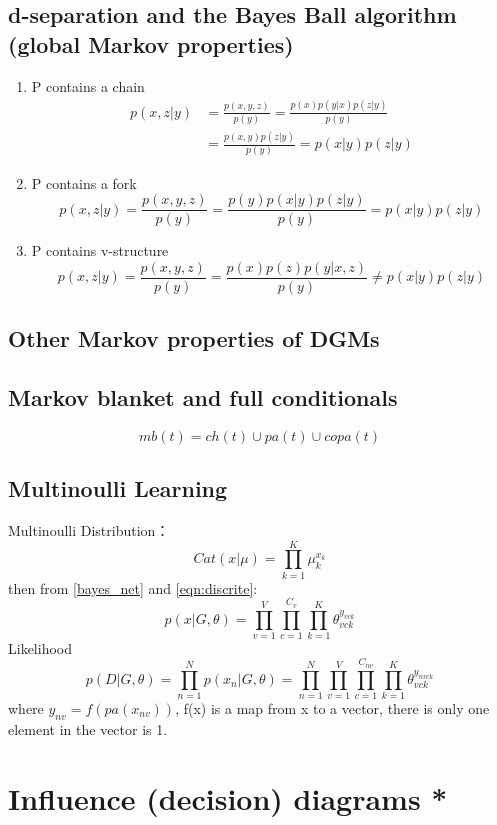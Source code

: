 \subsection{d-separation and the Bayes Ball algorithm (global Markov properties)}
\begin{enumerate}
\item P contains a chain
\begin{equation}\begin{split}
p(x,z|y) & = \frac{p(x,y,z)}{p(y)}
= \frac{p(x)p(y|x)p(z|y)}{p(y)} \\
 & = \frac{p(x,y)p(z|y)}{p(y)} = p(x|y)p(z|y)
\end{split}\end{equation}

\item P contains a fork
\begin{equation}
p(x,z|y) = \frac{p(x,y,z)}{p(y)}
= \frac{p(y)p(x|y)p(z|y)}{p(y)}
= p(x|y)p(z|y)
\end{equation}
\item P contains v-structure
\begin{equation}
p(x,z|y) = \frac{p(x,y,z)}{p(y)}
= \frac{p(x)p(z)p(y|x,z)}{p(y)}
\neq p(x|y)p(z|y)
\end{equation}
\end{enumerate}



\subsection{Other Markov properties of DGMs}


\subsection{Markov blanket and full conditionals}

\begin{equation}
mb(t) = ch(t)\cup pa(t)\cup copa(t)
\end{equation}


\subsection{Multinoulli Learning}
Multinoulli Distribution：
\begin{equation}\label{eqn:discrite}
Cat(x|\mu) = \prod_{k=1}^K\mu_k^{x_k}
\end{equation}
then from \ref{bayes_net} and \ref{eqn:discrite}:
\begin{equation}
p(x|G,\theta) = \prod_{v=1}^V\prod_{c=1}^{C_v}\prod_{k=1}^K
\theta_{vck}^{y_{vck}}
\end{equation}
Likelihood
\begin{equation}
p(D|G,\theta) = \prod_{n=1}^N p(x_n|G,\theta)
=\prod_{n=1}^N\prod_{v=1}^V\prod_{c=1}^{C_{nv}}\prod_{k=1}^K
\theta_{vck}^{y_{nvck}}
\end{equation}
where $y_{nv} = f(pa(x_{nv}))$, f(x) is a map from x to a vector, there is only one element in the vector is 1.


\section{Influence (decision) diagrams *}

